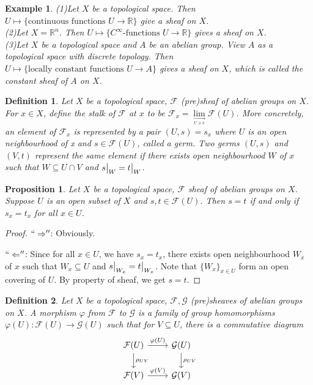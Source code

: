 \documentclass{ctexart}
\newtheorem{definition}{Definition}[section]
\newtheorem{proposition}{Proposition}[section]
\newtheorem{example}{Example}[section]
\newcommand{\leftquotes}{``}
\newcommand{\rightquotes}{''}
\begin{document}
\begin{example}
    (1)Let $X$ be a topological space.
    Then $U \longmapsto \{\text{continuous functions $U \longrightarrow \mathbb{R}$}\}$ give a sheaf on $X$. \\
    (2)Let $X = \mathbb{R}^{n}$.
    Then $U \longmapsto \{\text{$C^{\infty}$-functions $U \longrightarrow \mathbb{R}$}\}$ gives a sheaf on $X$. \\
    (3)Let $X$ be a topological space and $A$ be an abelian group.
    View $A$ as a topological space with discrete topology.
    Then $U \longmapsto \{\text{locally constant functions $U \longrightarrow A$}\}$ gives a sheaf on $X$, which is called the constant sheaf of $A$ on $X$.
\end{example}
\begin{definition}
    Let $X$ be a topological space, $\mathcal{F}$ (pre)sheaf of abelian groups on $X$.
    For $x\in X$, define the stalk of $\mathcal{F}$ at $x$ to be $\mathcal{F}_{x} = \underset{\underset{U\ni x}{\longrightarrow}}{\lim} \mathcal{F}(U)$.
    More concretely, an element of $\mathcal{F}_{x}$ is represented by a pair $(U, s) = s_{x}$ where $U$ is an open neighbourhood of x and $s\in \mathcal{F}(U)$, called a germ.
    Two germs $(U, s)$ and $(V, t)$ represent the same element if there exists open neighbourhood $W$ of $x$ such that $W \subseteq U \cap V$ and $s\big{|}_{W} = t\big{|}_{W}$.
\end{definition}
\begin{proposition}
    Let $X$ be a topological space, $\mathcal{F}$ sheaf of abelian groups on $X$.
    Suppose $U$ is an open subset of $X$ and $s,t\in \mathcal{F}(U)$.
    Then $s = t$ if and only if $s_{x} = t_{x}$ for all $x\in U$.
    \label{Proposition 1.1}
\end{proposition}
\begin{proof}
    $\leftquotes \Rightarrow \rightquotes$: Obviously.
    \par
    $\leftquotes \Leftarrow \rightquotes$: Since for all $x\in U$, we have $s_{x} = t_{x}$,
    there exists open neighbourhood $W_{x}$ of $x$ such that $W_{x} \subseteq U$ and $s\big{|}_{W_{x}} = t\big{|}_{W_{x}}$.
    Note that $\{W_{x}\}_{x\in U}$ form an open covering of $U$.
    By property of sheaf, we get $s = t$.
\end{proof}
\begin{definition}
    Let $X$ be a topological space, $\mathcal{F}, \mathcal{G}$ (pre)sheaves of abelian groups on $X$.
    A morphism $\varphi$ from $\mathcal{F}$ to $\mathcal{G}$ is a family of group homomorphisms $\varphi(U): \mathcal{F}(U) \longrightarrow \mathcal{G}(U)$ such that for $V \subseteq U$,
    there is a commutative diagram
    \begin{equation*}
        \begin{tikzcd}
            \mathcal{F}(U) \arrow[r, "\varphi(U)"] \arrow[d, "\rho_{UV}"] &
            \mathcal{G}(U) \arrow[d, "\rho_{UV}"] \\
            \mathcal{F}(V) \arrow[r, "\varphi(V)"] &
            \mathcal{G}(V)
        \end{tikzcd}
    \end{equation*}
\end{definition}
\end{document}
